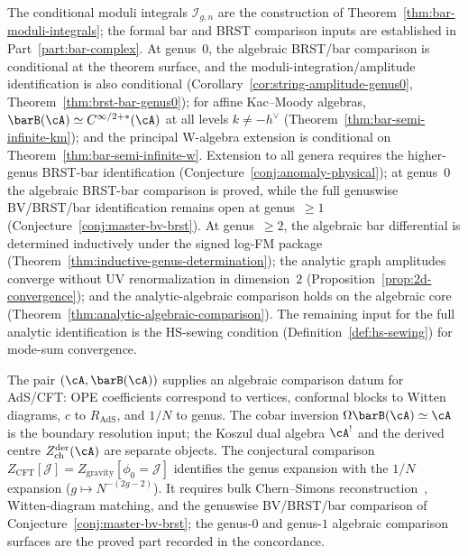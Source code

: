 \begin{remark}[Scope]
The conditional moduli integrals $\mathcal{I}_{g,n}$ are the
construction of Theorem~\ref{thm:bar-moduli-integrals}; the formal bar
and BRST comparison inputs are established in Part~\ref{part:bar-complex}.
At genus~$0$, the algebraic BRST/bar comparison is conditional at the
theorem surface, and the moduli-integration/amplitude identification is
also conditional
\textup{(}Corollary~\ref{cor:string-amplitude-genus0},
Theorem~\ref{thm:brst-bar-genus0}\textup{)}; for affine
Kac--Moody algebras, $\barB(\cA) \simeq C^{\infty/2+*}(\cA)$ at all
levels $k \neq -h^\vee$
\textup{(}Theorem~\ref{thm:bar-semi-infinite-km}\textup{)}; and the
principal W-algebra extension is conditional on
Theorem~\ref{thm:bar-semi-infinite-w}. Extension to all genera
requires the higher-genus BRST-bar identification
\textup{(}Conjecture~\ref{conj:anomaly-physical}\textup{)}; at
genus~$0$ the algebraic BRST-bar comparison is proved, while the
full genuswise BV/BRST/bar identification remains open
at genus~$\geq 1$
\textup{(}Conjecture~\ref{conj:master-bv-brst}\textup{)}. At genus~$\geq 2$, the algebraic bar differential is determined
inductively under the signed log-FM package
(Theorem~\ref{thm:inductive-genus-determination});
the analytic graph amplitudes converge without UV renormalization
in dimension~$2$ (Proposition~\ref{prop:2d-convergence}); and the
analytic-algebraic comparison holds on the algebraic core
(Theorem~\ref{thm:analytic-algebraic-comparison}).
The remaining input for the full analytic identification is the
HS-sewing condition (Definition~\ref{def:hs-sewing}) for mode-sum
convergence.
\end{remark}


\begin{conjecture}
\label{conj:holographic-bar-cobar}
The pair $(\cA,\barB(\cA))$ supplies an algebraic comparison datum for
AdS/CFT: OPE coefficients correspond to vertices, conformal blocks to
Witten diagrams, $c$ to $R_{\mathrm{AdS}}$, and $1/N$ to genus.  The
cobar inversion $\Omega\barB(\cA)\simeq\cA$ is the boundary
resolution input; the Koszul dual algebra $\cA^!$ and the derived
centre $Z_{\mathrm{ch}}^{\mathrm{der}}(\cA)$ are separate objects.
The conjectural comparison
$Z_{\mathrm{CFT}}[\mathcal{J}]=Z_{\mathrm{gravity}}[\phi_0=\mathcal{J}]$
identifies the genus expansion with the $1/N$ expansion
($g\mapsto N^{-(2g-2)}$). It requires bulk Chern--Simons
reconstruction~\cite{Wit89}, Witten-diagram matching, and the
genuswise BV/BRST/bar comparison of
Conjecture~\ref{conj:master-bv-brst}; the genus-$0$ and genus-$1$
algebraic comparison surfaces are the proved part recorded in the
concordance.
\end{conjecture}

